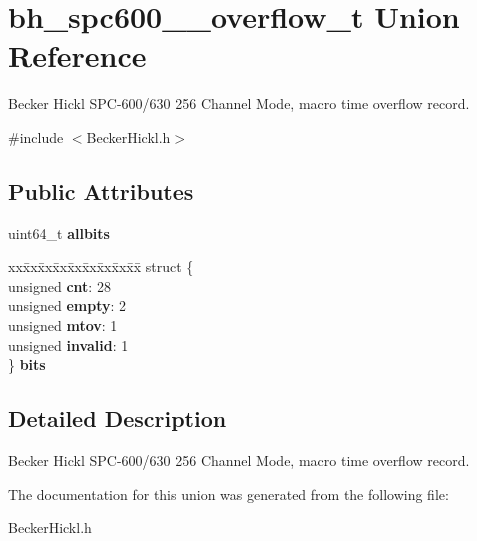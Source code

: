 \hypertarget{unionbh__spc600__256__overflow__t}{}\section{bh\+\_\+spc600\+\_\+\_\+overflow\+\_\+t Union Reference}
\label{unionbh__spc600__256__overflow__t}


Becker Hickl S\+P\+C-\/600/630 256 Channel Mode, macro time overflow record.  




{\ttfamily \#include $<$Becker\+Hickl.\+h$>$}

\subsection*{Public Attributes}
\begin{DoxyCompactItemize}
\item 
\mbox{\label{unionbh__spc600__256__overflow__t_a675db1e6d96c51570bd2a7b98b463b8a}} 
uint64\+\_\+t {\bfseries allbits}
\item 
\mbox{\label{unionbh__spc600__256__overflow__t_a11037b8501ffd6502cd6b60b048e101a}} 
\begin{tabbing}
xx\=xx\=xx\=xx\=xx\=xx\=xx\=xx\=xx\=\kill
struct \{\\
\>unsigned {\bfseries cnt}: 28\\
\>unsigned {\bfseries empty}: 2\\
\>unsigned {\bfseries mtov}: 1\\
\>unsigned {\bfseries invalid}: 1\\
\} {\bfseries bits}\\

\end{tabbing}\end{DoxyCompactItemize}


\subsection{Detailed Description}
Becker Hickl S\+P\+C-\/600/630 256 Channel Mode, macro time overflow record. 

The documentation for this union was generated from the following file\+:\begin{DoxyCompactItemize}
\item 
Becker\+Hickl.\+h\end{DoxyCompactItemize}

